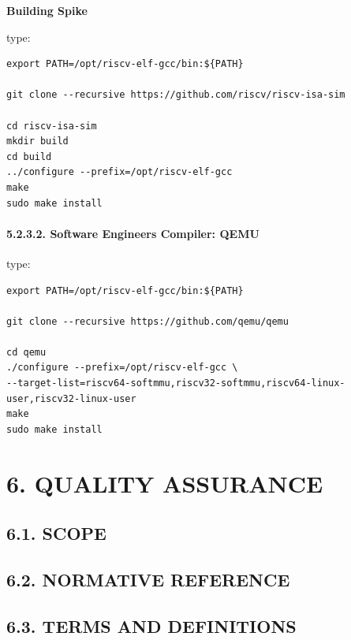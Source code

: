 \documentclass[
]{article}
\begin{document}
\textbf{Building Spike}

type:

\begin{verbatim}
export PATH=/opt/riscv-elf-gcc/bin:${PATH}

git clone --recursive https://github.com/riscv/riscv-isa-sim

cd riscv-isa-sim
mkdir build
cd build
../configure --prefix=/opt/riscv-elf-gcc
make
sudo make install
\end{verbatim}

\hypertarget{software-engineers-compiler-qemu-1}{%
\paragraph{5.2.3.2. Software Engineers Compiler:
QEMU}\label{software-engineers-compiler-qemu-1}}

type:

\begin{verbatim}
export PATH=/opt/riscv-elf-gcc/bin:${PATH}

git clone --recursive https://github.com/qemu/qemu

cd qemu
./configure --prefix=/opt/riscv-elf-gcc \
--target-list=riscv64-softmmu,riscv32-softmmu,riscv64-linux-user,riscv32-linux-user
make
sudo make install
\end{verbatim}

\hypertarget{quality-assurance-1}{%
\section{6. QUALITY ASSURANCE}\label{quality-assurance-1}}

\hypertarget{scope-1}{%
\subsection{6.1. SCOPE}\label{scope-1}}

\hypertarget{normative-reference-1}{%
\subsection{6.2. NORMATIVE REFERENCE}\label{normative-reference-1}}

\hypertarget{terms-and-definitions-1}{%
\subsection{6.3. TERMS AND DEFINITIONS}\label{terms-and-definitions-1}}
\end{document}
